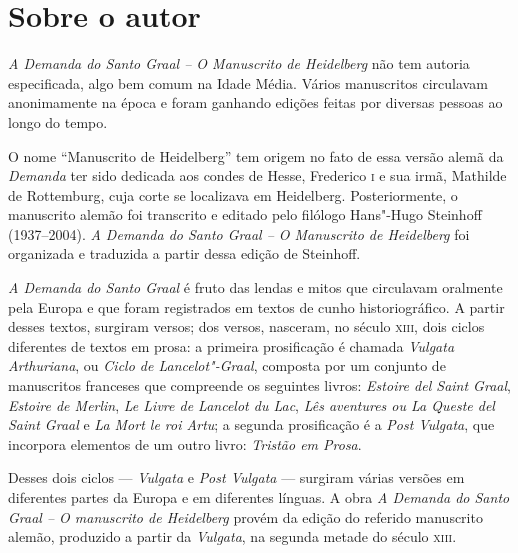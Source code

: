 
\section{Sobre o autor}

\emph{A Demanda do Santo Graal -- O Manuscrito de Heidelberg} não tem
autoria especificada, algo bem comum na Idade Média. Vários manuscritos
circulavam anonimamente na época e foram ganhando edições feitas por
diversas pessoas ao longo do tempo.

O nome ``Manuscrito de Heidelberg'' tem origem no fato de essa versão
alemã da \emph{Demanda} ter sido dedicada aos condes de Hesse, Frederico
\textsc{i} e sua irmã, Mathilde de Rottemburg, cuja corte se localizava em
Heidelberg.
Posteriormente, o manuscrito alemão foi transcrito e editado pelo
filólogo Hans"-Hugo Steinhoff (1937--2004).
\emph{A Demanda do Santo Graal -- O Manuscrito de Heidelberg} foi organizada e
traduzida a partir dessa edição de Steinhoff.



\emph{A Demanda do Santo Graal} é fruto das lendas e mitos
que circulavam oralmente pela Europa e que foram registrados em textos
de cunho historiográfico. A partir desses textos, surgiram versos; dos
versos, nasceram, no século \textsc{xiii}, dois ciclos diferentes de textos em
prosa: a primeira prosificação é chamada \emph{Vulgata Arthuriana}, ou
\emph{Ciclo de Lancelot"-Graal}, composta por um conjunto de manuscritos franceses que compreende os seguintes livros: \emph{Estoire del Saint Graal}, \emph{Estoire
de Merlin}, \emph{Le Livre de Lancelot du Lac}, \emph{Lês aventures ou La Queste del
Saint Graal} e \emph{La Mort le roi Artu}; a segunda prosificação é a
\emph{Post Vulgata}, que incorpora elementos de um outro livro:
\emph{Tristão em Prosa}.

Desses dois ciclos --- \emph{Vulgata} e \emph{Post
Vulgata} --- surgiram várias versões em diferentes partes da Europa e em
diferentes línguas. A obra \emph{A Demanda do Santo Graal -- O
manuscrito de Heidelberg} provém da edição do referido manuscrito
alemão, produzido a partir da \emph{Vulgata}, na segunda metade do
século \textsc{xiii}.

